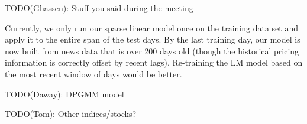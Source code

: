 
TODO(Ghassen): Stuff you said during the meeting

Currently, we only run our sparse linear model once on the training data set and apply it to the entire span of the test days. By the last training day, our model is now built from news data that is over 200 days old (though the historical pricing information is correctly offset by recent lags). Re-training the LM model based on the most recent window of days would be better.

TODO(Daway): DPGMM model

TODO(Tom): Other indices/stocks?
